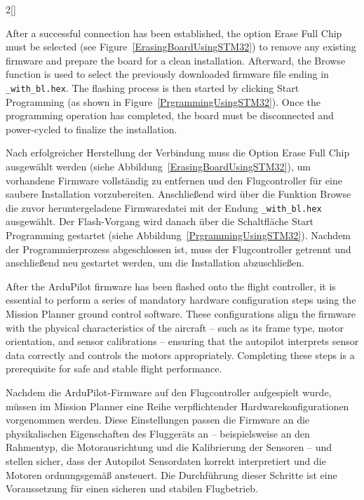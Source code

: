 \begin{paracol}{2}[]
\colstart

After a successful connection has been established, the option Erase Full Chip must be selected (see Figure~\ref{ErasingBoardUsingSTM32}) to remove any existing firmware and prepare the board for a clean installation. Afterward, the Browse function is used to select the previously downloaded firmware file ending in \verb!_with_bl.hex!. The flashing process is then started by clicking Start Programming (as shown in Figure~\ref{PrgrammingUsingSTM32}). Once the programming operation has completed, the board must be disconnected and power-cycled to finalize the installation.

\colger

Nach erfolgreicher Herstellung der Verbindung muss die Option Erase Full Chip ausgewählt werden (siehe Abbildung~\ref{ErasingBoardUsingSTM32}), um vorhandene Firmware vollständig zu entfernen und den Flugcontroller für eine saubere Installation vorzubereiten. Anschließend wird über die Funktion Browse die zuvor heruntergeladene Firmwaredatei mit der Endung \verb!_with_bl.hex! ausgewählt. Der Flash-Vorgang wird danach über die Schaltfläche Start Programming gestartet (siehe Abbildung~\ref{PrgrammingUsingSTM32}). Nachdem der Programmierprozess abgeschlossen ist, muss der Flugcontroller getrennt und anschließend neu gestartet werden, um die Installation abzuschließen.

\colende

\renewcommand{\deutschertitel}{Obligatorische Konfiguration}
\renewcommand{\englischertitel}{Mandatory Configuration}
\makrounterabschnitt
\label{AbschnittKonfigurationArduPilot}

After the ArduPilot firmware has been flashed onto the flight controller, it is essential to perform a series of mandatory hardware configuration steps using the Mission Planner ground control software. These configurations align the firmware with the physical characteristics of the aircraft -- such as its frame type, motor orientation, and sensor calibrations -- ensuring that the autopilot interprets sensor data correctly and controls the motors appropriately. Completing these steps is a prerequisite for safe and stable flight performance.

\colger

Nachdem die ArduPilot-Firmware auf den Flugcontroller aufgespielt wurde, müssen im Mission Planner eine Reihe verpflichtender Hardwarekonfigurationen vorgenommen werden. Diese Einstellungen passen die Firmware an die physikalischen Eigenschaften des Fluggeräts an -- beispielsweise an den Rahmentyp, die Motorausrichtung und die Kalibrierung der Sensoren -- und stellen sicher, dass der Autopilot Sensordaten korrekt interpretiert und die Motoren ordnungsgemäß ansteuert. Die Durchführung dieser Schritte ist eine Voraussetzung für einen sicheren und stabilen Flugbetrieb.


\end{paracol}
